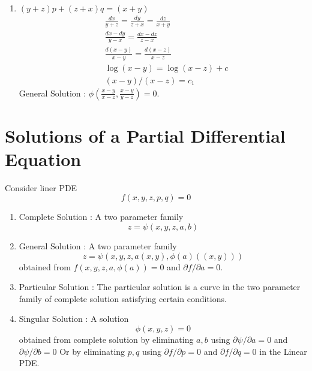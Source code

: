 \begin{enumerate}
\begin{align*}
			& \frac{dx-dy}{(x-y)(x+y+z)} = \frac{dy-dz}{(y-z)(y+z+x)}\\
			& \frac{d(x-y)}{x-y} = \frac{d(y-z)}{y-z} \\
			& \log (x-y) - \log (y-z) + c\\
			& (x-y)/(y-z) = c_1
			\intertext{Similarly,}
			& (x-z)/(y-z) = c_2
		\end{align*}
		General Solution : $\phi\left(\frac{x-y}{y-z},\frac{x-z}{y-z}\right) = 0$.
	\item $(y+z)p + (z+x)q = (x+y)$
		\begin{align*}
			& \frac{dx}{y+z} = \frac{dy}{z+x} = \frac{dz}{x+y} \\
			& \frac{dx-dy}{y-x} = \frac{dx-dz}{z-x} \\
			& \frac{d(x-y)}{x-y} = \frac{d(x-z)}{x-z} \\
			& \log (x-y) = \log (x-z) + c \\
			& (x-y)/(x-z) = c_1
		\end{align*}
		General Solution : $\phi\left(\frac{x-y}{x-z}, \frac{x-y}{y-z}\right) = 0$.
\end{enumerate}

\section{Solutions of a Partial Differential Equation}
Consider liner PDE \begin{equation} f(x,y,z,p,q) = 0 \end{equation}
\begin{enumerate}
	\item Complete Solution :
		A two parameter family \begin{equation}z = \psi(x,y,z,a,b) \end{equation}
	\item General Solution :
		A two parameter family \begin{equation}z = \psi(x,y,z,a(x,y),\phi(a)((x,y))) \end{equation} obtained from $f(x,y,z,a, \phi(a)) = 0$ and $\partial f/\partial a = 0$.
	\item Particular Solution :
		The particular solution is a curve in the two parameter family of complete solution satisfying certain conditions.
	\item Singular Solution : A solution \begin{equation}\phi(x,y,z) = 0\end{equation} obtained from complete solution by eliminating $a,b$ using $\partial \psi/\partial a = 0$ and $\partial \psi/\partial b = 0$ Or by eliminating $p,q$ using $\partial f/\partial p = 0$ and $\partial f/\partial q = 0$ in the Linear PDE.
\end{enumerate}
		
